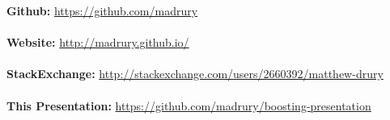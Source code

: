 \begin{frame}
\begin{center}
  \textbf{Github:} \url{https://github.com/madrury}\\~\\
  \textbf{Website:} \url{http://madrury.github.io/}\\~\\
  \textbf{StackExchange:} \url{http://stackexchange.com/users/2660392/matthew-drury}\\~\\
  \bigskip
  \textbf{This Presentation:} \url{https://github.com/madrury/boosting-presentation}
\end{center}

\end{frame}




